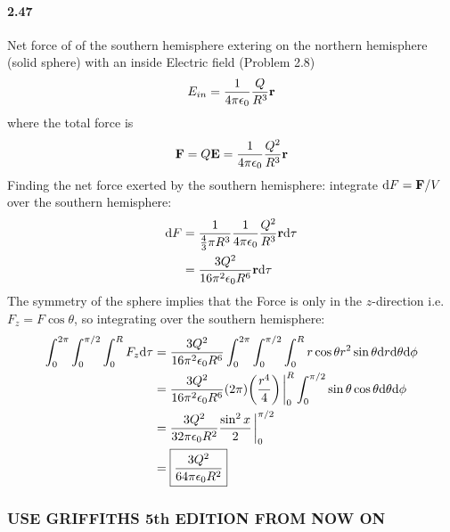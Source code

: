 \documentclass[../main.tex]{subfiles}
\begin{document}
\paragraph{2.47} Net force of of the southern hemisphere extering on the northern hemisphere (solid sphere) with an inside Electric field (Problem 2.8)
\begin{align*}
    E_{in} = \frac{1}{4\pi\epsilon_0} \frac{Q}{R^3} \vb r 
\end{align*}
where the total force is 
\begin{align*}
    \vb F = Q \vb E = \frac{1}{4\pi\epsilon_0} \frac{Q^2}{R^3} \vb r
\end{align*}
Finding the net force exerted by the southern hemisphere: integrate $\dd F = \vb F / V$ over the southern hemisphere:
\begin{align*}
    \dd F &= \frac{1}{\frac{4}{3} \pi R^3} \frac{1}{4\pi\epsilon_0} \frac{Q^2}{R^3} \vb r \dd \tau \\
    &= \frac{3Q^2}{16\pi^2 \epsilon_0 R^6} \vb r \dd \tau
\end{align*}
The symmetry of the sphere implies that the Force is only in the $z$-direction i.e. $F_z = F \cos\theta$, so integrating over the southern hemisphere:
\begin{align*}
    \int_0^{2\pi} \int_0^{\pi/2} \int_0^R F_z \dd \tau &= \frac{3Q^2}{16\pi^2 \epsilon_0 R^6} \int_0^{2\pi} \int_0^{\pi/2} \int_0^R r \cos\theta r^2 \sin \theta \dd r \dd \theta \dd \phi \\
    &= \frac{3Q^2}{16\pi^2 \epsilon_0 R^6} (2\pi) \qt(\frac{r^4}{4})\eval_0^R \int_0^{\pi/2} \sin\theta \cos\theta \dd \theta \dd \phi \\
    &= \frac{3Q^2}{32\pi \epsilon_0 R^2} \frac{\sin^2 x}{2} \eval_0^{\pi/2} \\
    &= \boxed{\frac{3Q^2}{64\pi \epsilon_0 R^2}}
\end{align*}

\subsubsection*{USE GRIFFITHS 5th EDITION FROM NOW ON}
\end{document}
